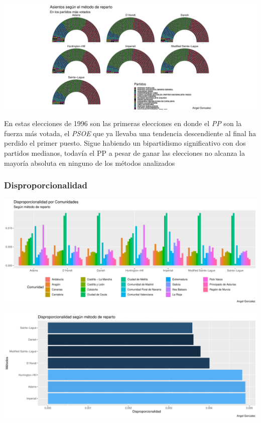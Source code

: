 \documentclass[12pt,a4paper,]{book}
\numberwithin{dummy}{section}
\theoremstyle{ocrenumbox}
\theoremstyle{blacknumex}
\theoremstyle{blacknumbox}
\theoremstyle{ocrenum}
\theoremstyle{ocrenum}
\begin{document}
\begin{center}\includegraphics[width=0.95\linewidth]{figurasR/unnamed-chunk-113-3} \end{center}

En estas elecciones de 1996 son las primeras elecciones en donde el
\emph{PP} son la fuerza más votada, el \emph{PSOE} que ya llevaba una
tendencia descendiente al final ha perdido el primer puesto. Sigue
habiendo un bipartidismo significativo con dos partidos medianos,
todavía el PP a pesar de ganar las elecciones no alcanza la mayoría
absoluta en ninguno de los métodos analizados

\hypertarget{disproporcionalidad-6}{%
\subsubsection{Disproporcionalidad}\label{disproporcionalidad-6}}

\begin{center}\includegraphics[width=0.95\linewidth]{figurasR/unnamed-chunk-114-1} \end{center}

\begin{center}\includegraphics[width=0.95\linewidth]{figurasR/unnamed-chunk-114-2} \end{center}
\end{document}

